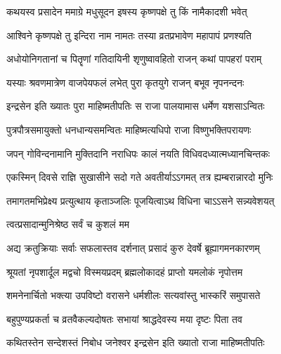 \label{sec:padma-ashvina-krishnendira}

\ganapatyadiDhyanam
\padmaPuranam



\twolineshloka
{कथयस्व प्रसादेन ममाग्रे मधुसूदन}
{इषस्य कृष्णपक्षे तु किं नामैकादशी भवेत्}%


\twolineshloka
{आश्विने कृष्णपक्षे तु इन्दिरा नाम नामतः}
{तस्या व्रतप्रभावेण महापापं प्रणश्यति}%

\twolineshloka
{अधोयोनिगतानां च पितॄणां गतिदायिनी}
{शृणुष्वावहितो राजन् कथां पापहरां पराम्}%

\twolineshloka
{यस्याः श्रवणमात्रेण वाजपेयफलं लभेत्}
{पुरा कृतयुगे राजन् बभूव नृपनन्दनः}%

\twolineshloka
{इन्द्रसेन इति ख्यातः पुरा माहिष्मतीपतिः}
{स राजा पालयामास धर्मेण यशसाऽन्वितः}%

\twolineshloka
{पुत्रपौत्रसमायुक्तो धनधान्यसमन्वितः}
{माहिष्मत्यधिपो राजा विष्णुभक्तिपरायणः}%

\twolineshloka
{जपन् गोविन्दनामानि मुक्तिदानि नराधिपः}
{कालं नयति विधिवदध्यात्मध्यानचिन्तकः}%

\twolineshloka
{एकस्मिन् दिवसे राज्ञि सुखासीने सदो गते}
{अवतीर्याऽऽगमत् तत्र ह्यम्बरान्नारदो मुनिः}%

\twolineshloka
{तमागतमभिप्रेक्ष्य प्रत्युत्थाय कृताञ्जलिः}
{पूजयित्वाऽथ विधिना चाऽऽसने सन्न्यवेशयत्}%


\onelineshloka
{त्वत्प्रसादान्मुनिश्रेष्ठ सर्वं च कुशलं मम}%

\twolineshloka
{अद्य क्रतुक्रियाः सर्वाः सफलास्तव दर्शनात्}
{प्रसादं कुरु देवर्षे ब्रूह्यागमनकारणम्}%


\twolineshloka
{श्रूयतां नृपशार्दूल मद्वचो विस्मयप्रदम्}
{ब्रह्मलोकादहं प्राप्तो यमलोकं नृपोत्तम}%

\twolineshloka
{शमनेनार्चितो भक्त्या उपविष्टो वरासने}
{धर्मशीलः सत्यवांस्तु भास्करिं समुपासते}%

\twolineshloka
{बहुपुण्यप्रकर्ता च व्रतवैकल्यदोषतः}
{सभायां श्राद्धदेवस्य मया दृष्टः पिता तव}%

\twolineshloka
{कथितस्तेन सन्देशस्तं निबोध जनेश्वर}
{इन्द्रसेन इति ख्यातो राजा माहिष्मतीपतिः}%

